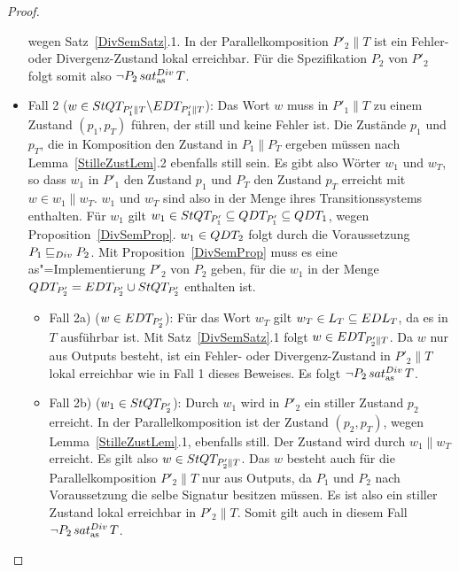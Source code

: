 \begin{proof}
\begin{itemize}
      wegen Satz~\ref{DivSemSatz}.1. In der Parallelkomposition $P'_2\|T$ ist
      ein Fehler- oder Divergenz-Zustand lokal erreichbar. Für die
      Spezifikation $P_2$ von $P'_2$ folgt somit also $\neg P_2\hspace{0.05cm}sat_\mathrm{as}^{Div}\hspace{0.05cm} T$.
    \item Fall 2 ($w\in StQT _{P'_1\|T} \backslash EDT _{P'_1\|T}$): Das Wort
      $w$ muss in $P'_1\|T$ zu einem Zustand $(p_1,p_T)$ führen, der still und
      keine Fehler ist. Die Zustände $p_1$ und $p_T$, die in Komposition den
      Zustand in $P_1\|P_T$ ergeben müssen nach Lemma~\ref{StilleZustLem}.2
      ebenfalls still sein. Es gibt also Wörter $w_1$ und $w_T$, so dass $w_1$
      in $P'_1$ den Zustand $p_1$ und $P_T$ den Zustand $p_T$ erreicht mit
      $w\in w_1\|w_T$. $w_1$ und $w_T$ sind also in der Menge \StQT{} ihres
      Transitionssystems enthalten. Für $w_1$ gilt $w_1\in StQT _{P'_1}
      \subseteq QDT _{P'_1}\subseteq QDT _1$, wegen
      Proposition~\ref{DivSemProp}. $w_1\in QDT _2$ folgt durch die
      Voraussetzung $P_1 \sqsubseteq  _{Div} P_2$. Mit Proposition~\ref{DivSemProp} muss es
      eine as"=Implementierung $P'_2$ von $P_2$ geben, für die $w_1$ in der
      Menge $QDT _{P'_2} = EDT _{P'_2} \cup StQT _{P'_2}$ enthalten ist.
      \begin{itemize}
        \item Fall 2a) ($w\in EDT _{P'_2}$): Für das Wort $w_T$ gilt $w_T\in L
          _T\subseteq EDL _T$, da es in $T$ ausführbar ist. Mit
          Satz~\ref{DivSemSatz}.1 folgt $w\in EDT _{P'_2\|T}$. Da $w$ nur aus
          Outputs besteht, ist ein Fehler- oder Divergenz-Zustand in $P'_2\|T$
          lokal erreichbar wie in Fall 1 dieses Beweises. Es folgt $\neg P_2
          \hspace{0.05cm}sat_\mathrm{as}^{Div}\hspace{0.05cm} T$.
        \item Fall 2b) ($w_1\in StQT _{P'_2}$): Durch $w_1$ wird in $P'_2$ ein
          stiller Zustand $p_2$ erreicht. In der Parallelkomposition ist der
          Zustand $(p_2,p_T)$, wegen Lemma~\ref{StilleZustLem}.1, ebenfalls
          still. Der Zustand wird durch $w_1\|w_T$ erreicht. Es gilt also
          $w\in StQT _{P'_2\|T}$. Das $w$ besteht auch für die
          Parallelkomposition $P'_2\|T$ nur aus Outputs, da $P_1$ und $P_2$
          nach Voraussetzung die selbe Signatur besitzen müssen. Es ist also
          ein stiller Zustand lokal erreichbar in $P'_2\|T$. Somit gilt auch in
          diesem Fall $\neg P_2\hspace{0.05cm}sat_\mathrm{as}^{Div}\hspace{0.05cm} T$.
      \end{itemize}
  \end{itemize}
\end{proof}

